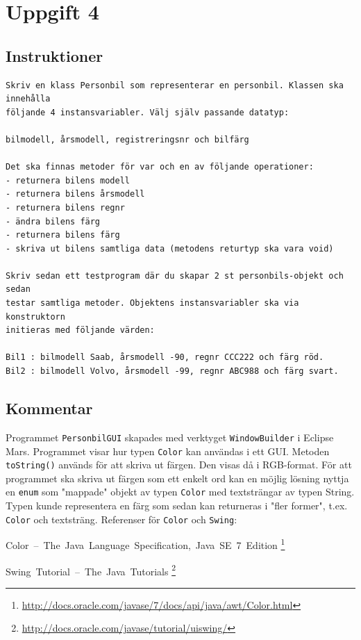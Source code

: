 \section{Uppgift 4}\label{sec:uppg04}

\subsection{Instruktioner}
\begin{Verbatim}[fontsize=small]
Skriv en klass Personbil som representerar en personbil. Klassen ska innehålla
följande 4 instansvariabler. Välj själv passande datatyp:

bilmodell, årsmodell, registreringsnr och bilfärg

Det ska finnas metoder för var och en av följande operationer:
- returnera bilens modell
- returnera bilens årsmodell
- returnera bilens regnr
- ändra bilens färg
- returnera bilens färg
- skriva ut bilens samtliga data (metodens returtyp ska vara void)

Skriv sedan ett testprogram där du skapar 2 st personbils-objekt och sedan
testar samtliga metoder. Objektens instansvariabler ska via konstruktorn
initieras med följande värden:

Bil1 : bilmodell Saab, årsmodell -90, regnr CCC222 och färg röd.
Bil2 : bilmodell Volvo, årsmodell -99, regnr ABC988 och färg svart.
\end{Verbatim}


\subsection{Kommentar}
Programmet \texttt{PersonbilGUI} skapades med verktyget \texttt{WindowBuilder}
i Eclipse Mars. Programmet visar hur typen \texttt{Color} kan användas i ett
GUI.  Metoden \texttt{toString()} används för att skriva ut färgen. Den visas
då i RGB-format. För att programmet ska skriva ut färgen som ett enkelt ord kan
en möjlig lösning nyttja en \texttt{enum} som "mappade" objekt av typen
\texttt{Color} med textsträngar av typen String. Typen kunde representera en
färg som sedan kan returneras i "fler former", t.ex. \texttt{Color} och
textsträng.
Referenser för \texttt{Color} och \texttt{Swing}:

\mbox{Color -- The Java Language Specification, Java SE 7 Edition}
\footnote{\url{http://docs.oracle.com/javase/7/docs/api/java/awt/Color.html}}

\mbox{Swing Tutorial -- The Java Tutorials}
\footnote{\url{http://docs.oracle.com/javase/tutorial/uiswing/}}


